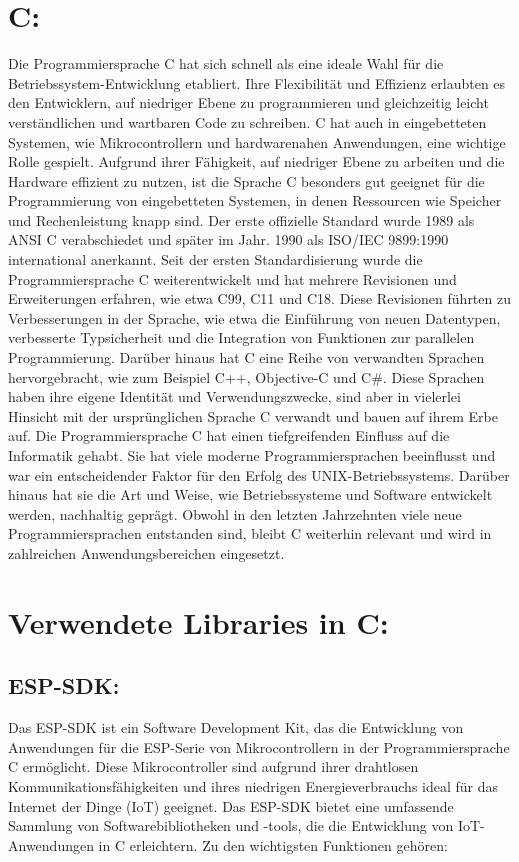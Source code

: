 \section{C:}
Die Programmiersprache C hat sich schnell als eine ideale Wahl für die Betriebssystem-Entwicklung etabliert. Ihre Flexibilität und Effizienz erlaubten es den Entwicklern, auf niedriger Ebene zu programmieren und gleichzeitig leicht verständlichen und wartbaren Code zu schreiben. 
C hat auch in eingebetteten Systemen, wie Mikrocontrollern und hardwarenahen Anwendungen, eine wichtige Rolle gespielt. 
Aufgrund ihrer Fähigkeit, auf niedriger Ebene zu arbeiten und die Hardware effizient zu nutzen, ist die Sprache C besonders gut geeignet für die Programmierung von eingebetteten Systemen, in denen Ressourcen wie Speicher und Rechenleistung knapp sind. 
Der erste offizielle Standard wurde 1989 als ANSI C verabschiedet und später im Jahr. 1990 als ISO/IEC 9899:1990 international anerkannt.
Seit der ersten Standardisierung wurde die Programmiersprache C weiterentwickelt und hat mehrere Revisionen und Erweiterungen erfahren, wie etwa C99, C11 und C18. 
Diese Revisionen führten zu Verbesserungen in der Sprache, wie etwa die Einführung von neuen Datentypen, verbesserte Typsicherheit und die Integration von Funktionen zur parallelen Programmierung.
Darüber hinaus hat C eine Reihe von verwandten Sprachen hervorgebracht, wie zum Beispiel C++, Objective-C und C\#. 
Diese Sprachen haben ihre eigene Identität und Verwendungszwecke, sind aber in vielerlei Hinsicht mit der ursprünglichen Sprache C verwandt und bauen auf ihrem Erbe auf.
Die Programmiersprache C hat einen tiefgreifenden Einfluss auf die Informatik gehabt. Sie hat viele moderne Programmiersprachen beeinflusst und war ein entscheidender Faktor für den Erfolg des UNIX-Betriebssystems. 
Darüber hinaus hat sie die Art und Weise, wie Betriebssysteme und Software entwickelt werden, nachhaltig geprägt. 
Obwohl in den letzten Jahrzehnten viele neue Programmiersprachen entstanden sind, bleibt C weiterhin relevant und wird in zahlreichen Anwendungsbereichen eingesetzt. 






\section{Verwendete Libraries in C:}
\subsection*{ESP-SDK:}
Das ESP-SDK ist ein Software Development Kit, das die Entwicklung von Anwendungen für die ESP-Serie von Mikrocontrollern in der Programmiersprache C ermöglicht.
Diese Mikrocontroller sind aufgrund ihrer drahtlosen Kommunikationsfähigkeiten und ihres niedrigen Energieverbrauchs ideal für das Internet der Dinge (IoT) geeignet. 
Das ESP-SDK bietet eine umfassende Sammlung von Softwarebibliotheken und -tools, die die Entwicklung von IoT-Anwendungen in C erleichtern. 
Zu den wichtigsten Funktionen gehören:

